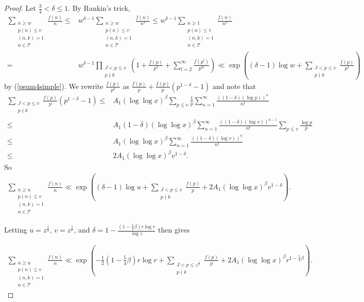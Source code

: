 \documentclass[10pt,a4paper]{amsart}
\begin{document}
\begin{proof}
Let $\frac 34 <\delta\leq 1$.  By Rankin's trick,
\begin{align*}
\sum_{\substack{n\geq w \\ p(n)\leq v \\ (n,k)=1 \\ n\in \mathcal T}}\frac{f(n)}{n}\leq &w^{\delta-1}\sum_{\substack{n\geq w \\ p(n)\leq v \\ (n,k)=1 \\ n\in \mathcal T}}\frac{f(n)}{n^\delta}\leq w^{\delta-1}\sum_{\substack{n\geq 1 \\ p(n)\leq v \\ (n,k)=1 \\ n\in \mathcal T}}\frac{f(n)}{n^\delta}\\
=&w^{\delta-1}\prod_{\substack{J<p\leq v \\ p\nmid k}}\left(1+\frac{f(p)}{p^\delta}+\sum_{l=2}^\infty \frac{f(p^l)}{p^{l\delta}}\right)\ll \exp\left((\delta-1)\log w+\sum_{\substack{J<p\leq v \\ p\nmid k}}\frac{f(p)}{p^\delta}\right)
\end{align*}
by (\ref{psum4simple}).
We rewrite $\frac{f(p)}{p^\delta}$ as $\frac{f(p)}{p}+\frac{f(p)}{p}(p^{1-\delta}-1)$ and note that
\begin{align*}
\sum_{\substack{J<p\leq v \\ p\nmid k}}\frac{f(p)}{p}(p^{1-\delta}-1)\leq &A_1 (\log\log x)^{\beta}\sum_{p\leq v}\frac 1p\sum_{n=1}^\infty \frac{\left((1-\delta)(\log p)\right)^n}{n!}\\
\leq &A_1 (1-\delta)(\log\log x)^{\beta}\sum_{n=1}^\infty \frac{\left((1-\delta)(\log v)\right)^{n-1}}{n!}\sum_{p\leq v}\frac{\log p}p\\
\leq &A_1 (\log\log x)^{\beta}\sum_{n=1}^\infty \frac{\left((1-\delta)(\log v)\right)^{n}}{n!}\\
\leq &2A_1 (\log\log x)^{\beta}v^{1-\delta}.
\end{align*}
So
\begin{align*}
\sum_{\substack{n\geq u \\ p(n)\leq v \\ (n,k)=1 \\ n\in \mathcal T}}\frac{f(n)}{n}\ll \exp\left((\delta-1)\log u+\sum_{\substack{J<p\leq v \\ p\nmid k}}\frac{f(p)}{p}+2A_1 (\log\log x)^{\beta}v^{1-\delta}\right).
\end{align*}



Letting $u=z^\frac 12$, $v=z^\frac 1r$, and $\delta=1-\frac{(1-\frac 54\beta )r\log r}{\log z}$ then gives

\begin{align*}
\sum_{\substack{n\geq u \\ p(n)\leq v \\ (n,k)=1 \\ n\in \mathcal T}}\frac{f(n)}{n}\ll \exp\left(-\frac 12\left(1-\frac 54\beta \right)r\log r+\sum_{\substack{J<p\leq z^\frac 1r \\ p\nmid k}}\frac{f(p)}{p}+2A_1 (\log\log x)^{\beta}r^{1-\frac 54\beta }\right).
\end{align*}
\end{proof}
\end{document}

